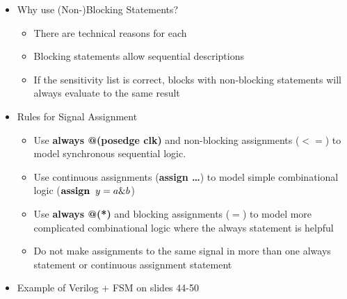 \documentclass[a4paper]{article}
\begin{document}
\begin{itemize}
\begin{itemize}
\begin{itemize}
\end{itemize}
\end{itemize}
\item Why use (Non-)Blocking Statements?
\begin{itemize}
\item There are technical reasons for each
\item Blocking statements allow sequential descriptions
\item If the sensitivity list is correct, blocks with non-blocking statements will always evaluate to the same result
\end{itemize}
\item Rules for Signal Assignment
\begin{itemize}
\item Use \textbf{always @(posedge clk)} and non-blocking assignments ($<=$) to model synchronous sequential logic. 
\item Use continuous assignments (\textbf{assign \dots}) to model simple combinational logic ($\textbf{assign} \hspace{2mm}y=a\& b$)
\item Use \textbf{always @(*)} and blocking assignments ($=$) to model more complicated combinational logic where the always statement is helpful
\item Do not make assignments to the same signal in more than one always statement or continuous assignment statement
\end{itemize}
\item Example of Verilog + FSM on slides 44-50
\end{itemize}
\end{document}
